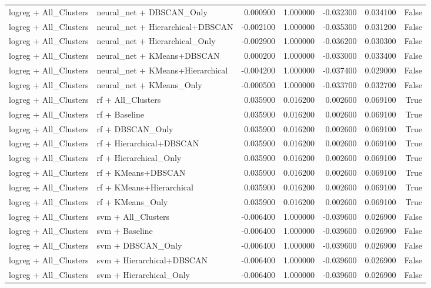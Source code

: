 \begin{tabular}{llrrrrr}
logreg + All_Clusters & neural_net + DBSCAN_Only & 0.000900 & 1.000000 & -0.032300 & 0.034100 & False \\
logreg + All_Clusters & neural_net + Hierarchical+DBSCAN & -0.002100 & 1.000000 & -0.035300 & 0.031200 & False \\
logreg + All_Clusters & neural_net + Hierarchical_Only & -0.002900 & 1.000000 & -0.036200 & 0.030300 & False \\
logreg + All_Clusters & neural_net + KMeans+DBSCAN & 0.000200 & 1.000000 & -0.033000 & 0.033400 & False \\
logreg + All_Clusters & neural_net + KMeans+Hierarchical & -0.004200 & 1.000000 & -0.037400 & 0.029000 & False \\
logreg + All_Clusters & neural_net + KMeans_Only & -0.000500 & 1.000000 & -0.033700 & 0.032700 & False \\
logreg + All_Clusters & rf + All_Clusters & 0.035900 & 0.016200 & 0.002600 & 0.069100 & True \\
logreg + All_Clusters & rf + Baseline & 0.035900 & 0.016200 & 0.002600 & 0.069100 & True \\
logreg + All_Clusters & rf + DBSCAN_Only & 0.035900 & 0.016200 & 0.002600 & 0.069100 & True \\
logreg + All_Clusters & rf + Hierarchical+DBSCAN & 0.035900 & 0.016200 & 0.002600 & 0.069100 & True \\
logreg + All_Clusters & rf + Hierarchical_Only & 0.035900 & 0.016200 & 0.002600 & 0.069100 & True \\
logreg + All_Clusters & rf + KMeans+DBSCAN & 0.035900 & 0.016200 & 0.002600 & 0.069100 & True \\
logreg + All_Clusters & rf + KMeans+Hierarchical & 0.035900 & 0.016200 & 0.002600 & 0.069100 & True \\
logreg + All_Clusters & rf + KMeans_Only & 0.035900 & 0.016200 & 0.002600 & 0.069100 & True \\
logreg + All_Clusters & svm + All_Clusters & -0.006400 & 1.000000 & -0.039600 & 0.026900 & False \\
logreg + All_Clusters & svm + Baseline & -0.006400 & 1.000000 & -0.039600 & 0.026900 & False \\
logreg + All_Clusters & svm + DBSCAN_Only & -0.006400 & 1.000000 & -0.039600 & 0.026900 & False \\
logreg + All_Clusters & svm + Hierarchical+DBSCAN & -0.006400 & 1.000000 & -0.039600 & 0.026900 & False \\
logreg + All_Clusters & svm + Hierarchical_Only & -0.006400 & 1.000000 & -0.039600 & 0.026900 & False \\

\end{tabular}
